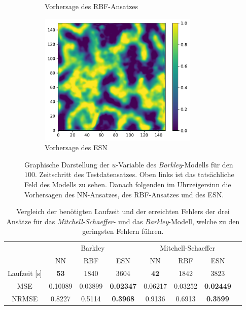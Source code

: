 \begin{figure}[h]
\begin{subfigure}{.5\textwidth}
		\setcapmargin[1cm]{1cm}
  		\caption{Vorhersage des \textsc{RBF}-Ansatzes}
  		\label{fig:exp_unblur_barkley_result_rbf_pred}
	\end{subfigure}%
	\begin{subfigure}{.5\textwidth}
		\centering
		\includegraphics[height=2.5in]{figures/results/unblur/esn_barkley_u_blur_pred.pdf}
		\setcapmargin[1cm]{1cm}
  		\caption{Vorhersage des \textsc{ESN}}
  		\label{fig:exp_unblur_barkley_result_esn_pred}
	\end{subfigure}
	\caption{Graphische Darstellung der $u$-Variable des \textit{Barkley}-Modells für den $100$. Zeitschritt des Testdatensatzes. Oben links ist das tatsächliche Feld des Modells zu sehen. Danach folgenden im Uhrzeigersinn die Vorhersagen des \textsc{NN}-Ansatzes, des \textsc{RBF}-Ansatzes und des \textsc{ESN}.}
	\label{fig:exp_unblur_barkley_result}
\end{figure} 

\begin{table}[h]
	\centering
	\captionsetup{width=0.9\linewidth}
	\begin{tabular}{|c|c|c|c|c|c|c|c|}
		\multicolumn{1}{c|}{} & \multicolumn{3}{c|}{Barkley} & \multicolumn{3}{c|}{Mitchell-Schaeffer}		\\
		\cline{2-7}
		\multicolumn{1}{c|}{} & NN & RBF & ESN & NN & RBF & ESN \\
		
		\hline
		\hline
		
		Laufzeit [s] 	& \textbf{53} 	& 1840		& 3604				& \textbf{42}	& 1842 		& 3823 \\
		\hline
		MSE 			& 0.10089		& 0.03899	& \textbf{0.02347} 	& 0.06217		& 0.03252 	& \textbf{0.02449} \\
		\hline
		NRMSE 			& 0.8227		& 0.5114	& \textbf{0.3968} 	& 0.9136		& 0.6913 	& \textbf{0.3599} \\
		\hline 
	\end{tabular} 
	\caption{Vergleich der benötigten Laufzeit und der erreichten Fehlers der drei Ansätze für das \textit{Mitchell-Schaeffer}- und das \textit{Barkley}-Modell, welche zu den geringsten Fehlern führen.}
	\label{tab:exp_unblur_comparison_results}
\end{table}

\FloatBarrier